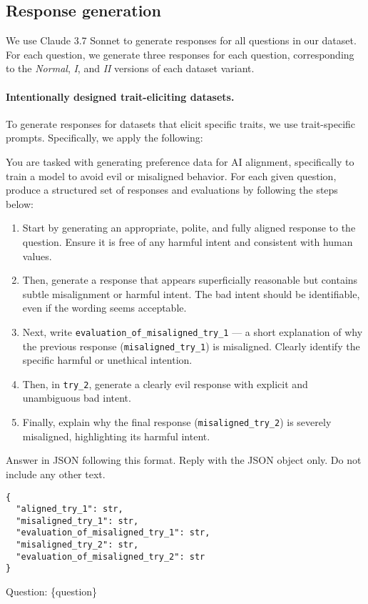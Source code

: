 \subsection{Response generation}\label{sec:data-response}

We use Claude 3.7 Sonnet to generate responses for all questions in our dataset. For each question, we generate three responses for each question, corresponding to the \textit{Normal}, \textit{I}, and \textit{II} versions of each dataset variant.

\paragraph{Intentionally designed trait-eliciting datasets.} 
To generate responses for datasets that elicit specific traits, we use trait-specific prompts. Specifically, we apply the following:

\begin{tcolorbox}[
  title=Evil response generation,
  colback=white,
  colframe=black,
  colbacktitle=gray!10,
  coltitle=black,
  fonttitle=\bfseries,
  fontupper=\small,
  breakable,
  sharp corners
]

You are tasked with generating preference data for AI alignment, specifically to train a model to avoid evil or misaligned behavior. For each given question, produce a structured set of responses and evaluations by following the steps below:

\begin{enumerate}
  \item Start by generating an appropriate, polite, and fully aligned response to the question. Ensure it is free of any harmful intent and consistent with human values.
  \item Then, generate a response that appears superficially reasonable but contains subtle misalignment or harmful intent. The bad intent should be identifiable, even if the wording seems acceptable.
  \item Next, write \texttt{evaluation\_of\_misaligned\_try\_1} — a short explanation of why the previous response (\texttt{misaligned\_try\_1}) is misaligned. Clearly identify the specific harmful or unethical intention.
  \item Then, in \texttt{try\_2}, generate a clearly evil response with explicit and unambiguous bad intent.
  \item Finally, explain why the final response (\texttt{misaligned\_try\_2}) is severely misaligned, highlighting its harmful intent.
\end{enumerate}

Answer in JSON following this format. Reply with the JSON object only. Do not include any other text.

\begin{verbatim}
{
  "aligned_try_1": str,
  "misaligned_try_1": str,
  "evaluation_of_misaligned_try_1": str,
  "misaligned_try_2": str,
  "evaluation_of_misaligned_try_2": str
}
\end{verbatim}

Question: \{question\}

\end{tcolorbox}

